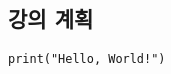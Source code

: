 \documentclass[../main.tex]{subfiles}
\begin{document}
\subsection{강의 계획}

\begin{verbatim}
print("Hello, World!")
\end{verbatim}
\end{document}
